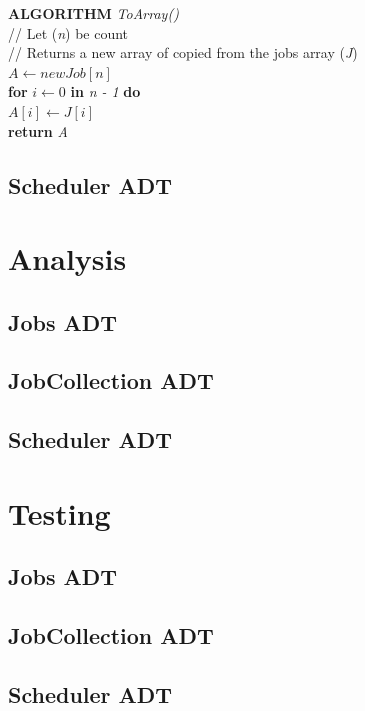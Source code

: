 \documentclass[12pt,a4paper]{article}
\begin{document}
				\textbf{ALGORITHM} \textit{ToArray()}\\
				\null\hspace{1cm}// Let (\textit{n}) be count\\
				\null\hspace{1cm}// Returns a new array of copied from the jobs array (\textit{J})\\
				\null\hspace{1cm}\textit{$A \gets new Job[n]$}\\
				\null\hspace{1cm}\textbf{for} \textit{$i \gets 0$} \textbf{in} \textit{n - 1} \textbf{do}\\
				\null\hspace{2cm}\textit{$A[i] \gets J[i]$}\\
				\null\hspace{1cm}\textbf{return} \textit{A}\\
				
		\subsection{Scheduler ADT}
	
	\section{Analysis}
		\subsection{Jobs ADT}
		\subsection{JobCollection ADT}
		\subsection{Scheduler ADT}

	\section{Testing}
		\subsection{Jobs ADT}
		\subsection{JobCollection ADT}
		\subsection{Scheduler ADT}
\end{document}
